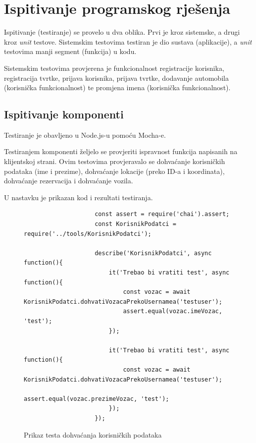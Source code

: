 			
			\eject 
		
	
		\section{Ispitivanje programskog rješenja}
							
			Ispitivanje (testiranje) se provelo u dva oblika. Prvi je kroz sistemske, a drugi kroz \textit{unit} testove. 
			Sistemskim testovima testiran je dio sustava (aplikacije), a \textit{unit} testovima manji segment (funkcija) u kodu.
			
			Sistemskim testovima provjerena je funkcionalnost registracije korisnika, registracija tvrtke, prijava korisnika, prijava tvrtke, dodavanje automobila (korisnička funkcionalnost) te promjena imena (korisnička funkcionalnost).
			
		
			
			
			\subsection{Ispitivanje komponenti}
			
			Testiranje je obavljeno u Node.js-u pomoću Mocha-e.\newline
			
			Testiranjem komponenti željelo se provjeriti ispravnost funkcija napisanih na klijentskoj strani. Ovim testovima provjeravalo se dohvaćanje korisničkih podataka (ime i prezime), dohvaćanje lokacije (preko ID-a i koordinata), dohvaćanje rezervacija i dohvaćanje vozila.\newline
			
			U nastavku je prikazan kod i rezultati testiranja.
	
			\begin{figure}[H]
				\begin{lstlisting}
					const assert = require('chai').assert;
					const KorisnikPodatci = require('../tools/KorisnikPodatci');
					
					describe('KorisnikPodatci', async function(){
						it('Trebao bi vratiti test', async function(){
							const vozac = await KorisnikPodatci.dohvatiVozacaPrekoUsernamea('testuser');
							assert.equal(vozac.imeVozac, 'test');
						});
						
						it('Trebao bi vratiti test', async function(){
							const vozac = await KorisnikPodatci.dohvatiVozacaPrekoUsernamea('testuser');
							assert.equal(vozac.prezimeVozac, 'test');
						});
					});
				\end{lstlisting}
				
				\centering
				\caption{Prikaz testa dohvaćanja korisničkih podataka}
				\label{fig:test - user - dohvacanje korisničkih podataka}
			\end{figure}
	

